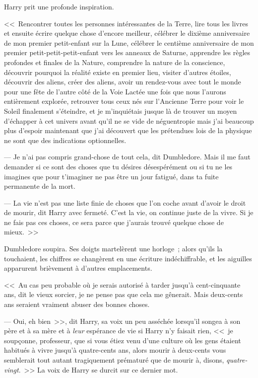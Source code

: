 Harry prit une profonde inspiration.

<<~Rencontrer toutes les personnes intéressantes de la Terre, lire tous les livres et ensuite écrire quelque chose d'encore meilleur, célébrer le dixième anniversaire de mon premier petit-enfant sur la Lune, célébrer le centième anniversaire de mon premier petit-petit-petit-enfant vers les anneaux de Saturne, apprendre les règles profondes et finales de la Nature, comprendre la nature de la conscience, découvrir pourquoi la réalité existe en premier lieu, visiter d'autres étoiles, découvrir des aliens, créer des aliens, avoir un rendez-vous avec tout le monde pour une fête de l'autre côté de la Voie Lactée une fois que nous l'aurons entièrement explorée, retrouver tous ceux nés sur l'Ancienne Terre pour voir le Soleil finalement s'éteindre, et je m'inquiétais jusque là de trouver un moyen d'échapper à cet univers avant qu'il ne se vide de néguentropie mais j'ai beaucoup plus d'espoir maintenant que j'ai découvert que les prétendues lois de la physique ne sont que des indications optionnelles.

--- Je n'ai pas compris grand-chose de tout cela, dit Dumbledore. Mais il me faut demander si ce sont des choses que tu désires désespérément ou si tu ne les imagines que pour t'imaginer ne pas être un jour fatigué, dans ta fuite permanente de la mort.

--- La vie n'est pas une liste finie de choses que l'on coche avant d'avoir le droit de mourir, dit Harry avec fermeté. C'est la vie, on continue juste de la vivre. Si je ne fais pas ces choses, ce sera parce que j'aurais trouvé quelque chose de mieux.~>>

Dumbledore soupira. Ses doigts martelèrent une horloge~; alors qu'ils la touchaient, les chiffres se changèrent en une écriture indéchiffrable, et les aiguilles apparurent brièvement à d'autres emplacements.

<<~Au cas peu probable où je serais autorisé à tarder jusqu'à cent-cinquante ans, dit le vieux sorcier, je ne pense pas que cela me gênerait. Mais deux-cents ans seraient vraiment abuser des bonnes choses.

--- Oui, eh bien~>>, dit Harry, sa voix un peu asséchée lorsqu'il songea à son père et à sa mère et à \emph{leur} espérance de vie si Harry n'y faisait rien, <<~je soupçonne, professeur, que si vous étiez venu d'une culture où les gens étaient habitués à vivre jusqu'à quatre-cents ans, alors mourir à deux-cents vous semblerait tout autant tragiquement prématuré que de mourir à, disons, \emph{quatre-vingt}.~>> La voix de Harry se durcit sur ce dernier mot.

